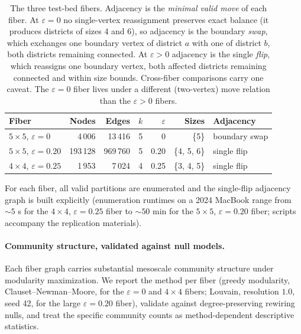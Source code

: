 \documentclass[11pt]{article}
\begin{document}
\begin{table}[htbp]
\centering
\small
\begin{tabular}{lrrrrrl}
\toprule
Fiber & Nodes & Edges & $k$ & $\varepsilon$ & Sizes & Adjacency \\
\midrule
$5 \times 5$, $\varepsilon = 0$    & 4\,006   & 13\,416  & 5 & 0    & \{5\}       & boundary swap \\
$5 \times 5$, $\varepsilon = 0.20$ & 193\,128 & 969\,760 & 5 & 0.20 & \{4, 5, 6\} & single flip \\
$4 \times 4$, $\varepsilon = 0.25$ & 1\,953   & 7\,024   & 4 & 0.25 & \{3, 4, 5\} & single flip \\
\bottomrule
\end{tabular}
\caption{The three test-bed fibers. Adjacency is the \emph{minimal
  valid move} of each fiber. At $\varepsilon = 0$ no single-vertex
  reassignment preserves exact balance (it produces districts of sizes
  4 and 6), so adjacency is the boundary \emph{swap}, which exchanges one
  boundary vertex of district $a$ with one of district $b$, both
  districts remaining connected. At $\varepsilon > 0$ adjacency is the
  single \emph{flip}, which reassigns one boundary vertex, both affected
  districts remaining connected and within size bounds. Cross-fiber
  comparisons carry one caveat. The $\varepsilon = 0$
  fiber lives under a different (two-vertex) move relation than the
  $\varepsilon > 0$ fibers.}\label{tab:fibers}
\end{table}

For each fiber, all valid partitions are enumerated and the single-flip
adjacency graph is built explicitly (enumeration runtimes on a 2024
MacBook range from $\sim 5$ s for the $4 \times 4$,
$\varepsilon = 0.25$ fiber to $\sim 50$ min for the $5 \times 5$,
$\varepsilon = 0.20$ fiber; scripts accompany the replication
materials).

\paragraph{Community structure, validated against null models.}\label{sec:fiber-islands}

Each fiber graph carries substantial mesoscale community structure
under modularity maximization. We report the method per fiber (greedy
modularity, Clauset--Newman--Moore, for the $\varepsilon = 0$ and
$4 \times 4$ fibers; Louvain, resolution $1.0$, seed 42, for the large
$\varepsilon = 0.20$ fiber), validate against degree-preserving
rewiring nulls, and treat the specific community counts as
method-dependent descriptive statistics.
\end{document}
